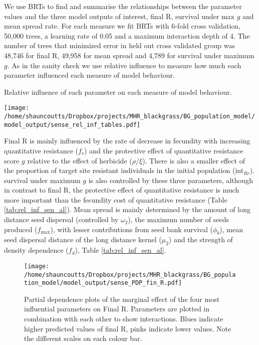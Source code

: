 \documentclass[12pt,a4paper]{article}
\begin{document}
We use BRTs to find and summarise the relationships between the parameter values and the three model outputs of interest, final R, survival under max $g$ and mean spread rate. For each measure we fit BRTs with 6-fold cross validation, 50,000 trees, a learning rate of 0.05 and a maximum interaction depth of 4. The number of trees that minimized error in held out cross validated group was 48,746 for final R, 49,958 for mean spread and 4,789 for survival under maximum $g$. As in the sanity check we use relative influence to measure how much each parameter influenced each measure of model behaviour. 

\begin{table}[H]
	\caption{Relative influence of each parameter on each measure of model behaviour.}
	\label{tab:rel_inf_sen_al}
	\centering
		\texttt{[image: /home/shauncoutts/Dropbox/projects/MHR\_blackgrass/BG\_population\_model/model\_output/sense\_rel\_inf\_tables.pdf]}
\end{table}    
    
Final R is mainly influenced by the rate of decrease in fecundity with increasing quantitative resistance ($f_r$) and the protective effect of quantitative resistance score $g$ relative to the effect of herbicide ($\rho / \xi$). There is also a smaller effect of the proportion of target site resistant individuals in the initial population (int$_{Rr}$). survival under maximum $g$ is also controlled by these three parameters, although in contrast to final R, the protective effect of quantitative resistance is much more important than the fecundity cost of quantitative resistance (Table \ref{tab:rel_inf_sen_al}). Mean spread is mainly determined by the amount of long distance seed dispersal (controlled by $\omega_2$), the maximum number of seeds produced ($f_\text{max}$), with lesser contributions from seed bank survival ($\phi_b$), mean seed dispersal distance of the long distance kernel ($\mu_2$) and the strength of density dependence ($f_d$), Table \ref{tab:rel_inf_sen_al}.               

\begin{figure}[H] 
	\centering
	\texttt{[image: /home/shauncoutts/Dropbox/projects/MHR\_blackgrass/BG\_population\_model/model\_output/sense\_PDP\_fin\_R.pdf]}
	\caption{Partial dependence plots of the marginal effect of the four most influential parameters on Final R. Parameters are plotted in combination with each other to show interactions. Blues indicate higher predicted values of final R, pinks indicate lower values. Note the different scales on each colour bar.}
	\label{fig:fin_R_PDP}
\end{figure}
\end{document}
